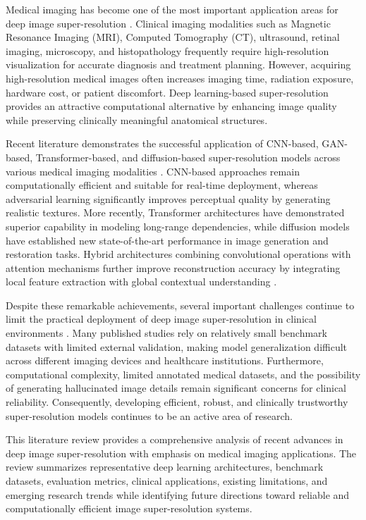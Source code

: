 \documentclass[conference]{IEEEtran}
\begin{document}
Medical imaging has become one of the most important application areas for deep image super-resolution \cite{ahmad2022multipath, gurappa2026medsrvision}. Clinical imaging modalities such as Magnetic Resonance Imaging (MRI), Computed Tomography (CT), ultrasound, retinal imaging, microscopy, and histopathology frequently require high-resolution visualization for accurate diagnosis and treatment planning. However, acquiring high-resolution medical images often increases imaging time, radiation exposure, hardware cost, or patient discomfort. Deep learning-based super-resolution provides an attractive computational alternative by enhancing image quality while preserving clinically meaningful anatomical structures.

Recent literature demonstrates the successful application of CNN-based, GAN-based, Transformer-based, and diffusion-based super-resolution models across various medical imaging modalities \cite{gurappa2026medsrvision, nandal2024realesrgan, zhao2025pdm}. CNN-based approaches remain computationally efficient and suitable for real-time deployment, whereas adversarial learning significantly improves perceptual quality by generating realistic textures. More recently, Transformer architectures have demonstrated superior capability in modeling long-range dependencies, while diffusion models have established new state-of-the-art performance in image generation and restoration tasks. Hybrid architectures combining convolutional operations with attention mechanisms further improve reconstruction accuracy by integrating local feature extraction with global contextual understanding \cite{chen2023hat, zou2022scet}.

Despite these remarkable achievements, several important challenges continue to limit the practical deployment of deep image super-resolution in clinical environments \cite{qiu2026rethinking}. Many published studies rely on relatively small benchmark datasets with limited external validation, making model generalization difficult across different imaging devices and healthcare institutions. Furthermore, computational complexity, limited annotated medical datasets, and the possibility of generating hallucinated image details remain significant concerns for clinical reliability. Consequently, developing efficient, robust, and clinically trustworthy super-resolution models continues to be an active area of research.

This literature review provides a comprehensive analysis of recent advances in deep image super-resolution with emphasis on medical imaging applications. The review summarizes representative deep learning architectures, benchmark datasets, evaluation metrics, clinical applications, existing limitations, and emerging research trends while identifying future directions toward reliable and computationally efficient image super-resolution systems.
\end{document}
